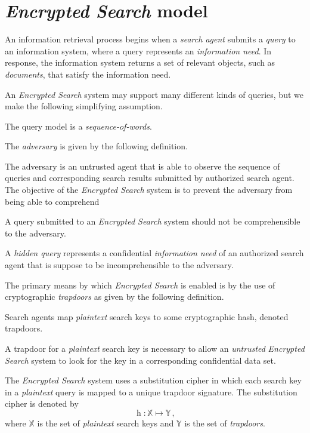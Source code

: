 \documentclass[ ../main.tex]{subfiles}
\begin{document}
\section{\emph{Encrypted Search} model}
\label{sec:es_model}
An information retrieval process begins when a \emph{search agent} submits a \emph{query} to an information system, where a query represents an \emph{information need}. In response, the information system returns a set of relevant objects, such as \emph{documents}, that satisfy the information need.

An \emph{Encrypted Search} system may support many different kinds of queries, but we make the following simplifying assumption.
\begin{assumption}
The query model is a \emph{sequence-of-words}.
\end{assumption}

The \emph{adversary} is given by the following definition.
\begin{definition}
The adversary is an untrusted agent that is able to observe the sequence of queries and corresponding search results submitted by authorized search agent. The objective of the \emph{Encrypted Search} system is to prevent the adversary from being able to comprehend 
\end{definition}

A query submitted to an \emph{Encrypted Search} system should not be comprehensible to the adversary.
\begin{definition}
A \emph{hidden query} represents a confidential \emph{information need} of an authorized search agent that is suppose to be incomprehensible to the adversary.
\end{definition}

The primary means by which \emph{Encrypted Search} is enabled is by the use of cryptographic \emph{trapdoors} as given by the following definition.
\begin{definition}[Trapdoor]
Search agents map \emph{plaintext} search keys to some cryptographic hash, denoted trapdoors.
\end{definition}
A trapdoor for a \emph{plaintext} search key is necessary to allow an \emph{untrusted} \emph{Encrypted Search} system to look for the key in a corresponding confidential data set.

\begin{assumption}
The \emph{Encrypted Search} system uses a substitution cipher in which each search key in a \emph{plaintext} query is mapped to a unique trapdoor signature. The substitution cipher is denoted by
\begin{equation}
    \operatorname{h} \colon \mathbb{X} \mapsto \mathbb{Y}\,,
\end{equation}
where $\mathbb{X}$ is the set of \emph{plaintext} search keys and $\mathbb{Y}$ is the set of \emph{trapdoors}.
\end{assumption}
\end{document}
